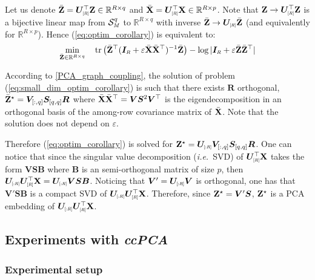 Let us denote $\bar{\Z} = \bm{U}_{\scaleto{[R]}{5pt}}^\top\Z \in \mathbb{R}^{R \times q}$ and $\bar{\X} = \bm{U}_{\scaleto{[R]}{5pt}}^\top\X \in \mathbb{R}^{R \times p}$. Note that $\Z \to \bm{U}_{\scaleto{[R]}{5pt}}^\top\Z$ is a bijective linear map from $\mathcal{S}^q_{\scaleto{M}{4pt}}$ to $\mathbb{R}^{R \times q}$ with inverse $\bar{\Z} \to \bm{U}_{\scaleto{[R]}{5pt}}\bar{\Z}$ (and equivalently for $\mathbb{R}^{R \times p}$). Hence (\ref{eq:optim_corollary}) is equivalent to:
\begin{align}\label{eq:small_dim_optim_corollary}
    \min_{\bar{\Z} \in \mathbb{R}^{R \times q}} \quad \operatorname{tr}\left(\bar{\Z}^\top(\bm{I}_{\scaleto{R}{4pt}} +  \varepsilon \bar{\X}\bar{\X}^\top)^{-1}\bar{\Z}\right) - \log |\bm{I}_{\scaleto{R}{4pt}}  +  \varepsilon \bar{\Z}\bar{\Z}^\top| 
\end{align}

According to \cref{PCA_graph_coupling}, the solution of problem (\ref{eq:small_dim_optim_corollary}) is such that there exists $\bm{R}$ orthogonal, $\bar{\mathbf{Z}}^\star = \bm{V}_{[:,q]} \bm{S}_{[q,q]} \bm{R}$ where $\bar{\mathbf{X}}\bar{\mathbf{X}}^\top = \bm{V} \bm{S}^2 \bm{V}^\top$ is the eigendecomposition in an orthogonal basis of the among-row covariance matrix of $\bar{\mathbf{X}}$. Note that the solution does not depend on $\varepsilon$.

Therefore (\ref{eq:optim_corollary}) is solved for $\Z^\star = \bm{U}_{\scaleto{[:R]}{5pt}}\bm{V}_{[:,q]} \bm{S}_{[q,q]} \bm{R}$. One can notice that since the singular value decomposition (\textit{i.e.}\ SVD) of $\bm{U}_{\scaleto{[R]}{5pt}}^\top\X$ takes the form $\bm{V}\bm{S}\bm{B}$ where $\bm{B}$ is an semi-orthogonal matrix of size $p$, then $\bm{U}_{\scaleto{[:R]}{5pt}}\bm{U}_{\scaleto{[R]}{5pt}}^\top\X = \bm{U}_{\scaleto{[:R]}{5pt}}\bm{V}\bm{S}\bm{B}$. Noticing that $\bm{V}' = \bm{U}_{\scaleto{[:R]}{5pt}}\bm{V}$ is orthogonal, one has that $\bm{V}' \bm{S}\bm{B}$ is a compact SVD of $\bm{U}_{\scaleto{[:R]}{5pt}}\bm{U}_{\scaleto{[R]}{5pt}}^\top\X$. Therefore, since $\mathbf{Z}^\star = \bm{V}' \bm{S}$, $\mathbf{Z}^\star$ is a PCA embedding of $\bm{U}_{\scaleto{[:R]}{5pt}}\bm{U}_{\scaleto{[R]}{5pt}}^\top\X$.


\subsection{Experiments with \textit{ccPCA}}\label{sec:ccpca_exps}

\subsubsection{Experimental setup}\label{sec:setup_ccpca}

